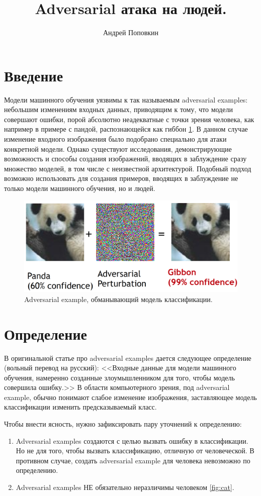 \documentclass[a4paper,12pt]{article}
\begin{document}
 
\title{Adversarial атака на людей.}
\author{Андрей Поповкин}
\maketitle

\section{Введение}
Модели машинного обучения уязвимы к так называемым adversarial examples: небольшим изменениям входных данных, приводящим к тому, что модели совершают ошибки, порой абсолютно неадекватные с точки зрения человека, как например в примере с пандой, распознающейся как гиббон \ref{fig:panda}. В данном случае изменение входного изображения было подобрано специально для атаки конкретной модели. Однако существуют исследования, демонстрирующие возможность и способы создания изображений, вводящих в заблуждение сразу множество моделей, в том числе с неизвестной архитектурой. Подобный подход возможно использовать для создания примеров, вводящих в заблуждение не только модели машинного обучения, но и людей.

\begin{figure}[h]
\centering
\includegraphics[width=0.7\linewidth]{panda.png}
\caption{Adversarial example, обманывающий модель классификации.}
\label{fig:panda}
\end{figure}

\section{Определение}
В оригинальной статье про adversarial examples дается следующее определение (вольный перевод на русский):
<<Входные данные для модели машинного обучения, намеренно созданные злоумышленником для того, чтобы модель совершила ошибку.>> В области компьютерного зрения, под adversarial example, обычно понимают слабое изменение изображения, заставляющее модель классификации изменить предсказываемый класс.

Чтобы внести ясность, нужно зафиксировать пару уточнений к определению:
\begin{enumerate}
    \item Adversarial examples создаются с целью вызвать ошибку в классификации. Но не для того, чтобы вызвать классификацию, отличную от человеческой. В противном случае, создать adversarial example для человека невозможно по определению.
    \item Adversarial examples НЕ обязательно неразличимы человеком \ref{fig:cat}.
\end{enumerate}
\end{document}

